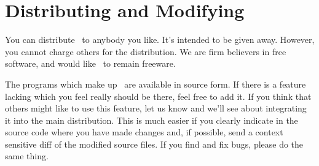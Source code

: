 \chapter{Distributing and Modifying \prog}

You can distribute \prog\ to anybody you like.  It's intended to be
given away.  However, you cannot charge others for the distribution.
We are firm believers in free software, and would like \prog\ to
remain freeware.

The programs which make up \prog\ are available in source form.  If
there is a feature lacking which you feel really should be there, feel
free to add it.  If you think that others might like to use this
feature, let us know and we'll see about integrating it into the main
distribution.  This is much easier if you clearly indicate in the
source code where you have made changes and, if possible, send a
context sensitive diff of the modified source files.  If you find and
fix bugs, please do the same thing.

